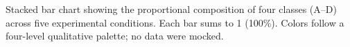 \caption{Stacked bar chart showing the proportional composition of four classes (A--D) across five experimental conditions. Each bar sums to 1 (100\%). Colors follow a four-level qualitative palette; no data were mocked.}
